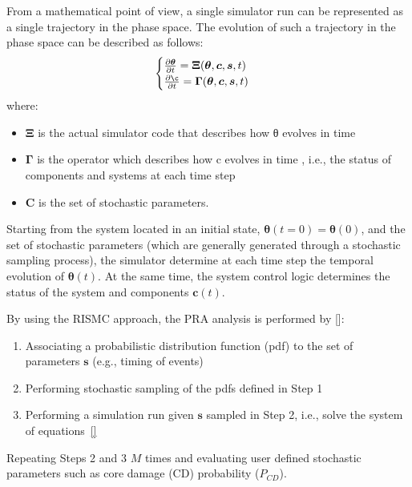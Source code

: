 From a mathematical point of view, a single simulator run can be represented as a single trajectory in the 
phase space. The evolution of such a trajectory in the phase space can be described as follows:
\begin{equation}
  \begin{cases}
    \frac{\partial \boldsymbol \theta }{\partial t}  = \boldsymbol \Xi (\boldsymbol \theta , \boldsymbol c, \boldsymbol s , t)    \\ 
    \frac{\partial \boldsymbol \c }{\partial t}  = \boldsymbol \Gamma (\boldsymbol \theta , \boldsymbol c, \boldsymbol s , t) 
  \end{cases}    
  \label{eq:trajectory}
\end{equation}
where:
\begin{itemize}
  \item $\boldsymbol \Xi$ is the actual simulator code that describes how θ evolves in time
  \item $\boldsymbol \Gamma$ is the operator which describes how c evolves in time , i.e., the status 
        of components and systems at each time step
  \item $\boldsymbol C$ is the set of stochastic parameters.
\end{itemize}

Starting from the system located in an initial state, $\boldsymbol \theta (t=0) = \boldsymbol \theta(0)$, 
and the set of stochastic parameters (which are generally generated through a stochastic sampling process), 
the simulator determine at each 
time step the temporal evolution of $\boldsymbol \theta (t)$. At the same time, the system control logic  determines the status 
of the system and components $\boldsymbol c(t)$.
 
By using the RISMC approach, the PRA analysis is performed by []:
\begin{enumerate}
  \item Associating a probabilistic distribution function (pdf) to the set of parameters $\boldsymbol s$ (e.g., timing of events)
  \item Performing stochastic sampling of the pdfs defined in Step 1
  \item Performing a simulation run given $\boldsymbol s$ sampled in Step 2, i.e., solve the system of equations~\ref{}
\end{enumerate}

Repeating Steps 2 and 3 $M$ times and evaluating user defined stochastic parameters such as core damage (CD) 
probability ($P_{CD}$).
